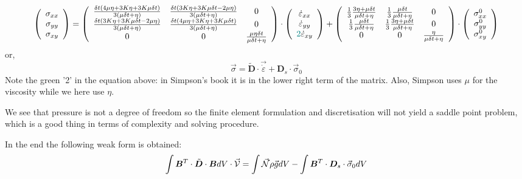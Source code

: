 \[
\left(
\begin{array}{c}
\sigma_{xx}\\ 
\sigma_{yy}\\ 
\sigma_{xy} 
\end{array}
\right)
=
\left(
\begin{array}{ccc}
\frac{\delta t(4\mu \eta + 3K \eta+ 3K \mu\delta t)}{3(\mu \delta t + \eta)} &
\frac{\delta t(3K \eta+ 3K \mu\delta t - 2\mu \eta)}{3(\mu \delta t + \eta)} &
0 \\
\frac{\delta t(3K \eta+ 3K \mu\delta t  - 2\mu \eta)}{3(\mu \delta t + \eta)}&
\frac{\delta t(4\mu \eta + 3K \eta+ 3K \mu\delta t)}{3(\mu \delta t + \eta)} &
0  \\
0 & 0 & \frac{\mu \eta \delta t }{\mu \delta t + \eta}  \\
\end{array}
\right)
\cdot
\left(
\begin{array}{c}
\dot\varepsilon_{xx}\\ 
\dot\varepsilon_{yy}\\ 
{\color{teal}2}\dot\varepsilon_{xy} 
\end{array}
\right) 
+
\left(
\begin{array}{cccccc}
\frac13\frac{3\eta + \mu \delta t}{\mu\delta t+\eta} & 
\frac13\frac{\mu \delta t}{\mu\delta t+\eta} & 
0\\
\frac13\frac{\mu \delta t}{\mu\delta t+\eta} & 
\frac13\frac{3\eta + \mu \delta t}{\mu\delta t+\eta} & 
0\\
0 & 0 & \frac{ \eta}{\mu\delta t + \eta}  
\end{array}
\right)
\cdot
\left(
\begin{array}{c}
\sigma_{xx}^0\\ 
\sigma_{yy}^0\\ 
\sigma_{xy}^0 
\end{array}
\right) 
\]
or, 
\[
\vec{\sigma} = \tilde{\bm D}\cdot \vec{\dot{\varepsilon}} +
{\bm D}_s \cdot \vec{\sigma}_0 
\]
Note the green '2' in the equation above: in Simpson's book it is in the
lower right term of the matrix. Also, Simpson uses $\mu$ for the viscosity
while we here use $\eta$. 

We see that pressure is not a degree of freedom so the finite element
formulation and discretisation will not yield a saddle point problem, 
which is a good thing in terms of complexity and solving procedure.

In the end the following weak form is obtained:
\[
\int {\bm B}^T \cdot \tilde{\bm D} \cdot {\bm B} dV \cdot \vec{\cal V} 
= \int \vec{{\mathcal{N}}} \rho \vec{g} dV -\int {\bm B}^T \cdot {\bm D}_s \cdot \vec{\sigma}_0 dV
\]


